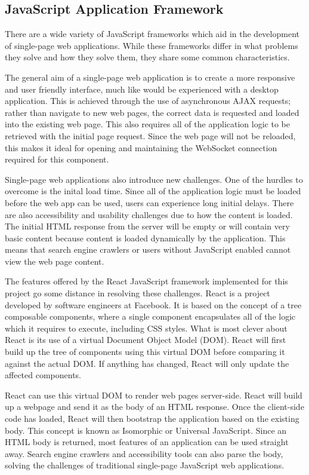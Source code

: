     \subsection{JavaScript Application Framework}
      There are a wide variety of JavaScript frameworks which aid in the development of single-page web applications. While these frameworks differ in what problems they solve and how they solve them, they share some common characteristics.

      The general aim of a single-page web application is to create a more responsive and user friendly interface, much like would be experienced with a desktop application. This is achieved through the use of asynchronous AJAX requests; rather than navigate to new web pages, the correct data is requested and loaded into the existing web page. This also requires all of the application logic to be retrieved with the initial page request. Since the web page will not be reloaded, this makes it ideal for opening and maintaining the WebSocket connection required for this component.

      Single-page web applications also introduce new challenges. One of the hurdles to overcome is the inital load time. Since all of the application logic must be loaded before the web app can be used, users can experience long initial delays. There are also accessibility and usability challenges due to how the content is loaded. The initial HTML response from the server will be empty or will contain very basic content because content is loaded dynamically by the application. This means that search engine crawlers or users without JavaScript enabled cannot view the web page content.

      The features offered by the React JavaScript framework implemented for this project go some distance in resolving these challenges. React is a project developed by software engineers at Facebook. It is based on the concept of a tree composable components, where a single component encapsulates all of the logic which it requires to execute, including CSS styles. What is most clever about React is its use of a virtual Document Object Model (DOM). React will first build up the tree of components using this virtual DOM before comparing it against the actual DOM. If anything has changed, React will only update the affected components.

      React can use this virtual DOM to render web pages server-side. React will build up a webpage and send it as the body of an HTML response. Once the client-side code has loaded, React will then bootstrap the application based on the existing body. This concept is known as Isomorphic or Universal JavaScript. Since an HTML body is returned, most features of an application can be used straight away. Search engine crawlers and accessibility tools can also parse the body, solving the challenges of traditional single-page JavaScript web applications.

